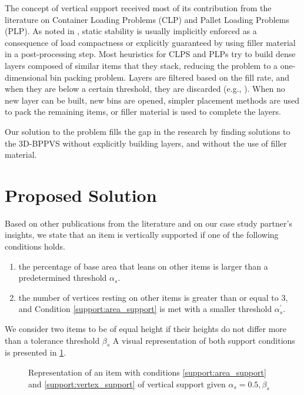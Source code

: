 \documentclass[11pt,a4paper,twocolumn]{article}
\begin{document}
The concept of vertical support received most of its contribution from the literature on Container Loading Problems (CLP) and Pallet Loading Problems (PLP).
As noted in \cite{BORTFELDT20131}, static stability is usually implicitly enforced as a consequence of load compactness or explicitly guaranteed by using filler material in a post-processing step.
Most heuristics for CLPS and PLPs try to build dense layers composed of similar items that they stack, reducing the problem to a one-dimensional bin packing problem.
Layers are filtered based on the fill rate, and when they are below a certain threshold, they are discarded (e.g., \cite{elhedhli2019three, Alonso2020}).
When no new layer can be built, new bins are opened, simpler placement methods are used to pack the remaining items, or filler material is used to complete the layers.

Our solution to the problem fills the gap in the research by finding solutions to the 3D-BPPVS without explicitly building layers, and without the use of filler material.

\section{Proposed Solution}

Based on other publications from the literature and on our case study partner's insights, we state that an item is vertically supported if one of the following conditions holds.

\begin{enumerate}[label={\textbf{Condition \arabic*}.},ref={\arabic*},leftmargin=*]
    \item the percentage of base area that leans on other items is larger than a predetermined threshold $\alpha_s$. \label{support:area_support}
    \item the number of vertices resting on other items is greater than or equal to 3, and Condition \ref{support:area_support} is met with a smaller threshold $\alpha^\prime_s$. \label{support:vertex_support}
\end{enumerate}
We consider two items to be of equal height if their heights do not differ more than a tolerance threshold $\beta_s$
A visual representation of both support conditions is presented in \cref{fig:support}.

\begin{figure}[h]
    \resizebox{\columnwidth}{!}{%
    
    }
    \caption{Representation of an item with conditions \ref{support:area_support} and \ref{support:vertex_support} of vertical support given $\alpha_s = 0.5, \beta_s$}
    \label{fig:support}
\end{figure}
\end{document}
